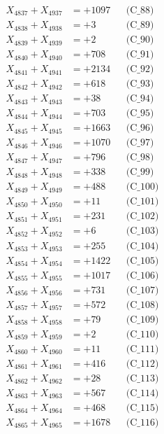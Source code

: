 \documentclass[a4paper,10pt]{article}
\begin{document}
{\begin{align}
X_{4837} + X_{4937} &= +1097 && \text{(C\_88)} \\
X_{4838} + X_{4938} &= +3 && \text{(C\_89)} \\
X_{4839} + X_{4939} &= +2 && \text{(C\_90)} \\
\allowbreak
X_{4840} + X_{4940} &= +708 && \text{(C\_91)} \\
X_{4841} + X_{4941} &= +2134 && \text{(C\_92)} \\
X_{4842} + X_{4942} &= +618 && \text{(C\_93)} \\
X_{4843} + X_{4943} &= +38 && \text{(C\_94)} \\
X_{4844} + X_{4944} &= +703 && \text{(C\_95)} \\
\allowbreak
X_{4845} + X_{4945} &= +1663 && \text{(C\_96)} \\
X_{4846} + X_{4946} &= +1070 && \text{(C\_97)} \\
X_{4847} + X_{4947} &= +796 && \text{(C\_98)} \\
X_{4848} + X_{4948} &= +338 && \text{(C\_99)} \\
X_{4849} + X_{4949} &= +488 && \text{(C\_100)} \\
\allowbreak
X_{4850} + X_{4950} &= +11 && \text{(C\_101)} \\
X_{4851} + X_{4951} &= +231 && \text{(C\_102)} \\
X_{4852} + X_{4952} &= +6 && \text{(C\_103)} \\
X_{4853} + X_{4953} &= +255 && \text{(C\_104)} \\
X_{4854} + X_{4954} &= +1422 && \text{(C\_105)} \\
\allowbreak
X_{4855} + X_{4955} &= +1017 && \text{(C\_106)} \\
X_{4856} + X_{4956} &= +731 && \text{(C\_107)} \\
X_{4857} + X_{4957} &= +572 && \text{(C\_108)} \\
X_{4858} + X_{4958} &= +79 && \text{(C\_109)} \\
X_{4859} + X_{4959} &= +2 && \text{(C\_110)} \\
\allowbreak
X_{4860} + X_{4960} &= +11 && \text{(C\_111)} \\
X_{4861} + X_{4961} &= +416 && \text{(C\_112)} \\
X_{4862} + X_{4962} &= +28 && \text{(C\_113)} \\
X_{4863} + X_{4963} &= +567 && \text{(C\_114)} \\
X_{4864} + X_{4964} &= +468 && \text{(C\_115)} \\
\allowbreak
X_{4865} + X_{4965} &= +1678 && \text{(C\_116)} \\

\end{align}}
\end{document}
